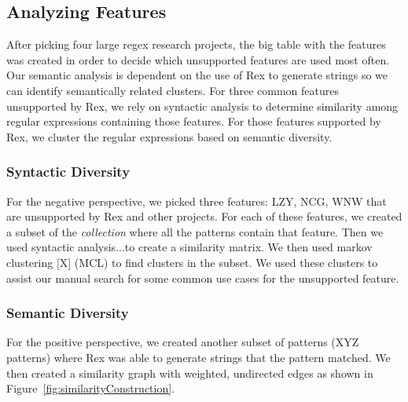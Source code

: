\subsection{Analyzing Features}
\label{study:features}

After picking four large regex research projects, the big table with the features was created in order to decide which unsupported features are used most often.
Our semantic analysis is dependent on the use of Rex to generate strings so we can identify semantically related clusters. For three common features unsupported by Rex, we rely on syntactic analysis to determine similarity among regular expressions containing those features. For those features supported by Rex, we cluster the regular expressions based on semantic diversity.

\subsubsection{Syntactic Diversity}
For the negative perspective, we picked three features: LZY, NCG, WNW that are unsupported by Rex and other projects.  For each of these features, we created a subset of the \emph{collection} where all the patterns contain that feature.  Then we used syntactic analysis...to create a similarity matrix.  We then used markov clustering [X] (MCL) to find clusters in the subset.  We used these clusters to assist our manual search for some common use cases for the unsupported feature.

\subsubsection{Semantic Diversity}
For the positive perspective, we created another subset of patterns (XYZ patterns) where Rex was able to generate strings that the pattern matched.  We then created a similarity graph with weighted, undirected edges as shown in Figure~\ref{fig:similarityConstruction}.

